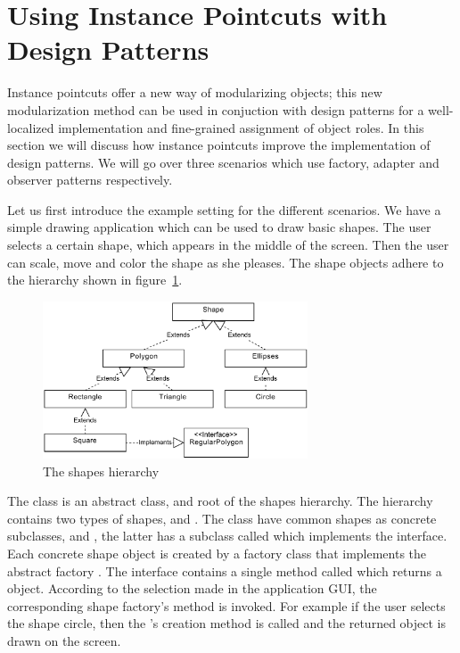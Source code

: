 \section{Using Instance Pointcuts with Design Patterns}

Instance pointcuts offer a new way of modularizing objects; this new modularization method can be used in conjuction with design patterns for a well-localized implementation and fine-grained assignment of object roles. 
In this section we will discuss how instance pointcuts improve the implementation of design patterns.
We will go over three scenarios which use factory, adapter and observer patterns respectively.

Let us first introduce the example setting for the different scenarios.
We have a simple drawing application which can be used to draw basic shapes. 
The user selects a certain shape, which appears in the middle of the screen. 
Then the user can scale, move and color the shape as she pleases.
The shape objects adhere to the hierarchy shown in figure~\ref{fig:shapeshier}.


\begin{figure}
\centering
 \includegraphics[width=0.7\textwidth]{images/shapes.pdf}
 \caption{The shapes hierarchy}
 \label{fig:shapeshier}
\end{figure}

The  class is an abstract class, and root of the shapes hierarchy. 
The hierarchy contains two types of shapes,  and .
The  class have common shapes as concrete subclasses,  and , the latter has a subclass called  which implements the  interface.
Each concrete shape object is created by a factory class that implements the abstract factory . 
The  interface contains a single method called  which returns a  object.
According to the selection made in the application GUI, the corresponding shape factory's  method is invoked.
For example if the user selects the shape circle, then the 's creation method is called and the returned object is drawn on the screen. 

